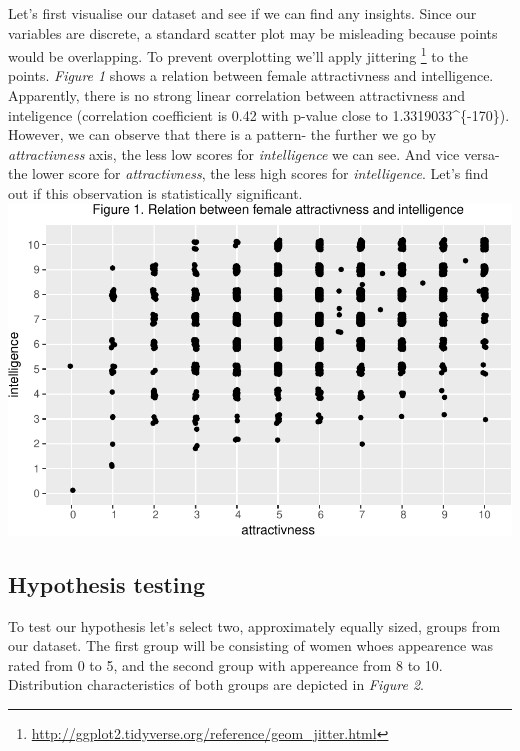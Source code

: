 \documentclass[]{article}
\let\rmarkdownfootnote\footnote%
\def\footnote{\protect\rmarkdownfootnote}
\begin{document}
Let's first visualise our dataset and see if we can find any insights.
Since our variables are discrete, a standard scatter plot may be
misleading because points would be overlapping. To prevent overplotting
we'll apply jittering \footnote{\url{http://ggplot2.tidyverse.org/reference/geom_jitter.html}}
to the points. \emph{Figure 1} shows a relation between female
attractivness and intelligence. Apparently, there is no strong linear
correlation between attractivness and inteligence (correlation
coefficient is 0.42 with p-value close to
1.3319033\^{}\{-170\}). However, we can observe that there is a
pattern- the further we go by \emph{attractivness} axis, the less low
scores for \emph{intelligence} we can see. And vice versa- the lower
score for \emph{attractivness}, the less high scores for
\emph{intelligence}. Let's find out if this observation is statistically
significant.
\includegraphics{FemaleAttractivenessAndIntelligence_files/figure-latex/unnamed-chunk-4-1.pdf}

\subsection{Hypothesis testing}\label{hypothesis-testing}

To test our hypothesis let's select two, approximately equally sized,
groups from our dataset. The first group will be consisting of women
whoes appearence was rated from 0 to 5, and the second group with
appereance from 8 to 10. Distribution characteristics of both groups are
depicted in \emph{Figure 2}.
\end{document}
